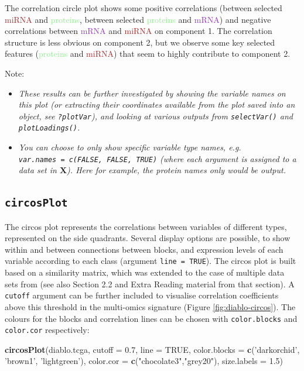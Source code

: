 \documentclass[]{book}
\newenvironment{Shaded}{\begin{snugshade}}{\end{snugshade}}
\newcommand{\DataTypeTok}[1]{\textcolor[rgb]{0.13,0.29,0.53}{#1}}
\newcommand{\FloatTok}[1]{\textcolor[rgb]{0.00,0.00,0.81}{#1}}
\newcommand{\KeywordTok}[1]{\textcolor[rgb]{0.13,0.29,0.53}{\textbf{#1}}}
\newcommand{\NormalTok}[1]{#1}
\newcommand{\OtherTok}[1]{\textcolor[rgb]{0.56,0.35,0.01}{#1}}
\newcommand{\StringTok}[1]{\textcolor[rgb]{0.31,0.60,0.02}{#1}}
\begin{document}
The correlation circle plot shows some positive correlations (between selected \textcolor{brown}{miRNA} and \textcolor{lightgreen}{proteins}, between selected \textcolor{lightgreen}{proteins} and \textcolor{darkorchid}{mRNA}) and negative correlations between \textcolor{darkorchid}{mRNA} and \textcolor{brown}{miRNA} on component 1. The correlation structure is less obvious on component 2, but we observe some key selected features (\textcolor{lightgreen}{proteins} and \textcolor{brown}{miRNA}) that seem to highly contribute to component 2.

Note:

\begin{itemize}
\item
  \emph{These results can be further investigated by showing the variable names on this plot (or extracting their coordinates available from the plot saved into an object, see \texttt{?plotVar}), and looking at various outputs from \texttt{selectVar()} and \texttt{plotLoadings()}.}
\item
  \emph{You can choose to only show specific variable type names, e.g. \texttt{var.names\ =\ c(FALSE,\ FALSE,\ TRUE)} (where each argument is assigned to a data set in \(\boldsymbol X\)). Here for example, the protein names only would be output.}
\end{itemize}

\hypertarget{circosplot}{%
\subsection{\texorpdfstring{\texttt{circosPlot}}{circosPlot}}\label{circosplot}}

The circos plot represents the correlations between variables of different types, represented on the side quadrants. Several display options are possible, to show within and between connections between blocks, and expression levels of each variable according to each class (argument \texttt{line\ =\ TRUE}). The circos plot is built based on a similarity matrix, which was extended to the case of multiple data sets from \citet{Gon12} (see also Section 2.2 and Extra Reading material from that section). A \texttt{cutoff} argument can be further included to visualise correlation coefficients above this threshold in the multi-omics signature (Figure \ref{fig:diablo-circos}). The colours for the blocks and correlation lines can be chosen with \texttt{color.blocks} and \texttt{color.cor} respectively:

\begin{Shaded}
\begin{Highlighting}[]
\KeywordTok{circosPlot}\NormalTok{(diablo.tcga, }\DataTypeTok{cutoff =} \FloatTok{0.7}\NormalTok{, }\DataTypeTok{line =} \OtherTok{TRUE}\NormalTok{, }
           \DataTypeTok{color.blocks =} \KeywordTok{c}\NormalTok{(}\StringTok{'darkorchid'}\NormalTok{, }\StringTok{'brown1'}\NormalTok{, }\StringTok{'lightgreen'}\NormalTok{),}
           \DataTypeTok{color.cor =} \KeywordTok{c}\NormalTok{(}\StringTok{"chocolate3"}\NormalTok{,}\StringTok{"grey20"}\NormalTok{), }\DataTypeTok{size.labels =} \FloatTok{1.5}\NormalTok{)}
\end{Highlighting}
\end{Shaded}
\end{document}
